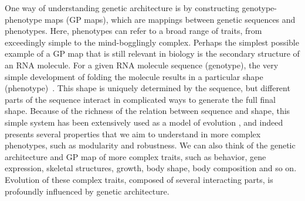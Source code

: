 \begin{refsection}
One way of understanding genetic architecture is by constructing
genotype-phenotype maps (GP maps), which are mappings between genetic sequences and
phenotypes. Here, phenotypes can refer to a broad range of traits, from
exceedingly simple to the mind-bogglingly complex. Perhaps the simplest
possible example of a GP map that is still relevant in biology is the
secondary structure of an RNA molecule. For a given RNA molecule
sequence (genotype), the very simple development of folding the molecule
results in a particular shape (phenotype)~\parencite{Ancel2000-vt}. This
shape is uniquely determined by the sequence, but different parts of the
sequence interact in complicated ways to generate the full final shape.
Because of the richness of the relation between sequence and shape, this
simple system has been extensively used as a model of evolution
\parencite{Stadler2006-og}, and indeed presents several properties that we
aim to understand in more complex phenotypes, such as modularity and
robustness. We can also think of the genetic architecture and GP map of
more complex traits, such as behavior, gene expression, skeletal
structures, growth, body shape, body composition and so on. Evolution of
these complex traits, composed of several interacting parts, is
profoundly influenced by genetic architecture.


\end{refsection}
